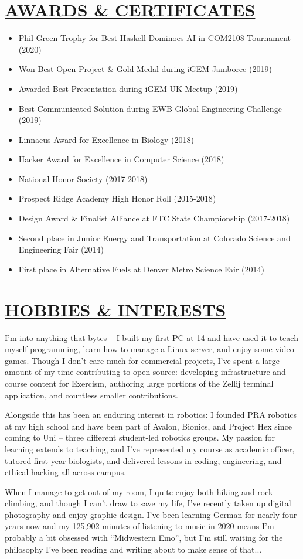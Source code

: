 \documentclass[twocolumn, a4paper, fontsize=9pt, headsepline, footsepline]{scrartcl}
\begin{document}
\section*{\ul{AWARDS \& CERTIFICATES}}
\begin{itemize}
\item Phil Green Trophy for Best Haskell Dominoes AI in COM2108 Tournament (2020)
\item Won Best Open Project \& Gold Medal during iGEM Jamboree (2019)
\item Awarded Best Presentation during iGEM UK Meetup (2019)
\item Best Communicated Solution during EWB Global Engineering Challenge (2019)
\item Linnaeus Award for Excellence in Biology (2018)
\item Hacker Award for Excellence in Computer Science (2018)
\item National Honor Society (2017-2018)
\item Prospect Ridge Academy High Honor Roll (2015-2018)
\item Design Award \& Finalist Alliance at FTC State Championship (2017-2018)
\item Second place in Junior Energy and Transportation at Colorado Science and
  Engineering Fair (2014)
\item First place in Alternative Fuels at Denver Metro Science Fair (2014)
\end{itemize}
\section*{\ul{HOBBIES \& INTERESTS}}
\noindent
I'm into anything that bytes – I built my first PC at 14 and have used it to
teach myself programming, learn how to manage a Linux server, and enjoy some
video games. Though I don't care much for commercial projects, I've spent a
large amount of my time contributing to open-source: developing infrastructure
and course content for Exercism, authoring large portions of the Zellij terminal
application, and countless smaller contributions.

Alongside this has been an enduring interest in robotics: I founded PRA robotics
at my high school and have been part of Avalon, Bionics, and Project Hex since
coming to Uni – three different student-led robotics groups. My passion for
learning extends to teaching, and I've represented my course as academic
officer, tutored first year biologists, and delivered lessons in coding,
engineering, and ethical hacking all across campus.

When I manage to get out of my room, I quite enjoy both hiking and rock
climbing, and though I can't draw to save my life, I've recently taken up
digital photography and enjoy graphic design. I've been learning German for
nearly four years now and my 125,902 minutes of listening to music in 2020 means
I'm probably a bit obsessed with ``Midwestern Emo'', but I'm still waiting for
the philosophy I've been reading and writing about to make sense of that...
\pagebreak
\end{document}
